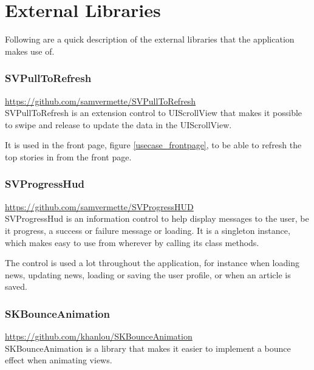 

\section{External Libraries}
Following are a quick description of the external libraries that the application makes use of.

\subsubsection{SVPullToRefresh}
\url{https://github.com/samvermette/SVPullToRefresh}\\

SVPullToRefresh is an extension control to UIScrollView that makes it possible to swipe and release to update the data in the UIScrollView.

It is used in the front page, figure \ref{usecase_frontpage}, to be able to refresh the top stories in from the front page.


\subsubsection{SVProgressHud}
\url{https://github.com/samvermette/SVProgressHUD}\\

SVProgressHud is an information control to help display messages to the user, be it progress, a success or failure message or loading. It is a singleton instance, which makes easy to use from wherever by calling its class methods.

The control is used a lot throughout the application, for instance when loading news, updating news, loading or saving the user profile, or when an article is saved.


\subsubsection{SKBounceAnimation}
\url{https://github.com/khanlou/SKBounceAnimation}\\

SKBounceAnimation is a library that makes it easier to implement a bounce effect when animating views.

